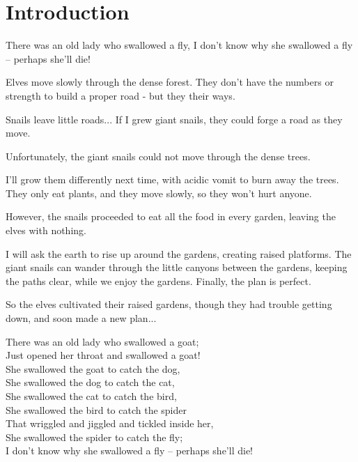 \section{Introduction}

\begin{exampletext}
  There was an old lady who swallowed a fly,
  I don't know why she swallowed a fly – perhaps she'll die!
\end{exampletext}

Elves move slowly through the dense forest.
They don't have the numbers or strength to build a proper road - but they their ways.

\begin{exampletext}
  Snails leave little roads...
  If I grew giant snails, they could forge a road as they move.
\end{exampletext}

Unfortunately, the giant snails could not move through the dense trees.

\begin{exampletext}
  I'll grow them differently next time, with acidic vomit to burn away the trees.
  They only eat plants, and they move slowly, so they won't hurt anyone.
\end{exampletext}

However, the snails proceeded to eat all the food in every garden, leaving the elves with nothing.

\begin{exampletext}
  I will ask the earth to rise up around the gardens, creating raised platforms.
  The giant snails can wander through the little canyons between the gardens, keeping the paths clear, while we enjoy the gardens.
  Finally, the plan is perfect.
\end{exampletext}

So the elves cultivated their raised gardens, though they had trouble getting down, and soon made a new plan...

\begin{exampletext}
  There was an old lady who swallowed a goat; \\
  Just opened her throat and swallowed a goat! \\
  She swallowed the goat to catch the dog, \\
  She swallowed the dog to catch the cat, \\
  She swallowed the cat to catch the bird, \\
  She swallowed the bird to catch the spider \\
  That wriggled and jiggled and tickled inside her, \\
  She swallowed the spider to catch the fly; \\
  I don't know why she swallowed a fly – perhaps she'll die! \\
\end{exampletext}

